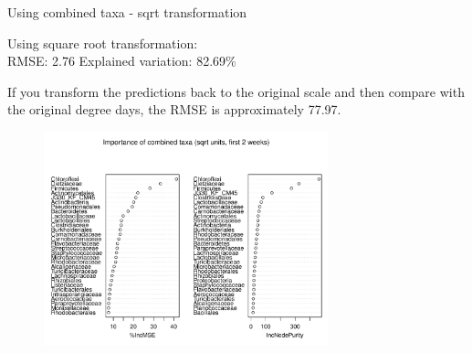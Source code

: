 \documentclass{beamer}
\begin{document}
\begin{frame}{Using combined taxa - sqrt transformation}

  {\scriptsize
    
  \noindent Using square root transformation:\\
  RMSE: 2.76  \hspace{0.05in}  Explained variation: 82.69\%

  \vspace{0.05in}
  
  \noindent If you transform the predictions back to the original
  scale and then compare with the original degree days, the RMSE is
  approximately 77.97.
  
\begin{center}
\begin{figure}
  \includegraphics[width=3.25in]{../all_together/first_two_weeks/sqrt_units_first_two_weeks_combined_imp_plot}
\end{figure}
\end{center}
\vspace{-0.25in}
}
  
\end{frame}
\end{document}
